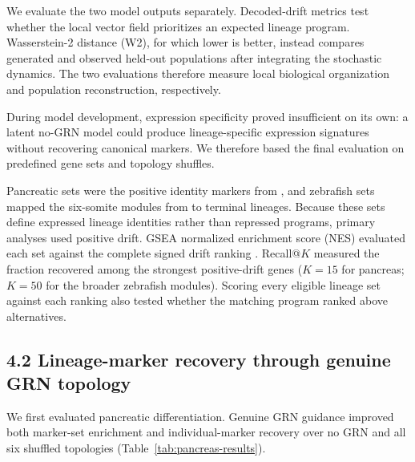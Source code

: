 \documentclass[
  11pt,
  letterpaper,
]{article}
\begin{document}
We evaluate the two model outputs separately. Decoded-drift metrics test
whether the local vector field prioritizes an expected lineage program.
Wasserstein-2 distance (W2), for which lower is better, instead compares
generated and observed held-out populations after integrating the
stochastic dynamics. The two evaluations therefore measure local
biological organization and population reconstruction, respectively.

\FloatBarrier
During model development, expression specificity proved insufficient on
its own: a latent no-GRN model could produce lineage-specific expression
signatures without recovering canonical markers. We therefore based the
final evaluation on predefined gene sets and topology shuffles.

Pancreatic sets were the positive identity markers from \textcite{veres_charting_2019},
and zebrafish sets mapped the six-somite modules from \textcite{farrell_single-cell_2018} to
terminal lineages. Because
these sets define expressed lineage identities rather than repressed
programs, primary analyses used positive drift. GSEA normalized
enrichment score (NES) evaluated each set against the complete signed
drift ranking \parencite{subramanian_gene_2005}. Recall@\(K\) measured the
fraction recovered among the strongest positive-drift genes
(\(K=15\) for pancreas; \(K=50\) for the broader zebrafish modules).
Scoring every eligible lineage set against each ranking also tested
whether the matching program ranked above alternatives.

\subsection{4.2 Lineage-marker recovery through genuine GRN
topology}\label{lineage-marker-recovery-through-genuine-grn-topology}

We first evaluated pancreatic differentiation. Genuine GRN guidance
improved both marker-set enrichment and individual-marker recovery over
no GRN and all six shuffled topologies
(Table~\ref{tab:pancreas-results}).
\end{document}
